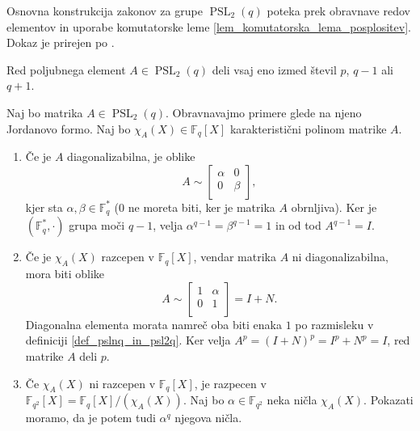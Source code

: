 \documentclass[mat1, tisk]{fmfdelo}
\numberwithin{equation}{section}  %
\begin{document}
    Osnovna konstrukcija zakonov za grupe $\operatorname{PSL}_2(q)$ poteka prek obravnave redov elementov in uporabe komutatorske leme \ref{lem_komutatorska_lema_posplositev}.
    Dokaz je prirejen po \cite[str.~36--37]{Schneider_2016}. 
    \begin{lema}
    \label{lem_redi_elementov_v_psl2q}
    Red poljubnega element $A \in  \operatorname{PSL}_2(q)$ deli vsaj eno izmed števil $p$, $q-1$ ali $q + 1$. 
    \end{lema}
    \begin{dokaz}
    Naj bo matrika $A \in \operatorname{PSL}_2(q)$. Obravnavajmo primere glede na njeno Jordanovo formo. Naj bo $\chi_A(X) \in \mathbb{F}_q[X]$ karakteristični polinom matrike $A$. 
    \begin{enumerate}
        \item Če je $A$ diagonalizabilna, je oblike \begin{equation*}
        A \sim  \begin{bmatrix}
            \alpha & 0 \\
            0 & \beta \\
        \end{bmatrix},
        \end{equation*}  
          kjer sta $\alpha, \beta \in  \mathbb{F}_q^{*}$ (0 ne moreta biti, ker je matrika $A$ obrnljiva). Ker je $(\mathbb{F}_q^{*}, \cdot)$ grupa moči $q-1$, velja $\alpha^{q-1} = \beta^{q -1} = 1$ in od tod $A^{q-1} = I$.
          \item Če je $\chi_A(X)$ razcepen v $\mathbb{F}_q[X]$, vendar matrika $A$ ni diagonalizabilna, mora biti oblike \begin{equation*}
          A \sim  \begin{bmatrix}
            1 & \alpha\\
            0 & 1\\
          \end{bmatrix} = I + N.
          \end{equation*}  
        Diagonalna elementa morata namreč oba biti enaka $1$ po razmisleku v definiciji \ref{def_pslnq_in_psl2q}. Ker velja $A^{p} = (I + N)^{p} = I^{p} + N^{p} = I$, red matrike $A$ deli $p$.  
    \item Če $\chi_A(X)$ ni razcepen v $\mathbb{F}_q[X]$, je razpecen v  $\mathbb{F}_{q^2}[X] = \mathbb{F}_q[X] / (\chi_A(X))$. Naj bo $\alpha \in \mathbb{F}_{q^2}$ neka ničla $\chi_A(X)$. Pokazati moramo, da je potem tudi $\alpha^q$ njegova ničla.

\end{enumerate}
\end{dokaz}
\end{document}
